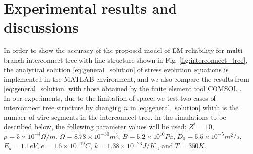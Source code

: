 \section{Experimental results and discussions}
\label{sec:experimental_results}
In order to show the accuracy of the proposed model of EM reliability
for multi-branch interconnect tree with line structure shown in
Fig. \ref{fig:interconnect_tree}, the analytical solution
\eqref{eq:general_solution} of stress evolution equations is
implemented in the MATLAB environment, and we also compare the results
from \eqref{eq:general_solution} with those obtained by the finite
element tool COMSOL \cite{COMSOL}. In our experiments, due to the
limitation of space, we test two cases of interconnect tree structure
by changing $n$ in \eqref{eq:general_solution} which is the number of
wire segments in the interconnect tree. In the simulations to be
described below, the following parameter values will be used:
$Z^*=10$, $\rho=3\times10^{-8} \Omega/m$,
$\Omega=8.78\times10^{-30}m^3$, $B=5.2\times10^{10} Pa$,
$D_0=5.5\times10^{-5} m^2/s$, $E_a=1.1eV$, $e=1.6\times10^{-19}C$,
$k=1.38\times10^{-23}J/K$ , and $T=350K$.

